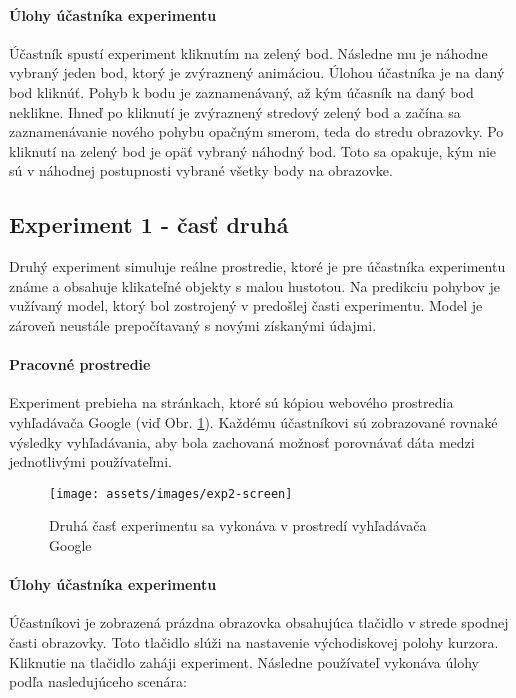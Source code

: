 \paragraph{Úlohy účastníka experimentu}
Účastník spustí experiment kliknutím na zelený bod. Následne mu je náhodne vybraný jeden bod, ktorý je zvýraznený animáciou. Úlohou účastníka je na daný bod kliknúť. Pohyb k bodu je zaznamenávaný, až kým účasník na daný bod neklikne. Ihneď po kliknutí je zvýraznený stredový zelený bod a začína sa zaznamenávanie nového pohybu opačným smerom, teda do stredu obrazovky. Po kliknutí na zelený bod je opäť vybraný náhodný bod. Toto sa opakuje, kým nie sú v náhodnej postupnosti vybrané všetky body na obrazovke. 

\subsection{Experiment 1 - časť druhá \label{sec:exp1-1}}
Druhý experiment simuluje reálne prostredie, ktoré je pre účastníka experimentu známe a obsahuje klikateľné objekty s malou hustotou. Na predikciu pohybov je vužívaný model, ktorý bol zostrojený v predošlej časti experimentu. Model je zároveň neustále prepočítavaný s novými získanými údajmi.

\paragraph{Pracovné prostredie}
Experiment prebieha na stránkach, ktoré sú kópiou webového prostredia vyhľadávača Google (viď Obr. \ref{fig:exp2-screen}). Každému účastníkovi sú zobrazované rovnaké výsledky vyhľadávania, aby bola zachovaná možnosť porovnávať dáta medzi jednotlivými používateľmi.

\begin{figure}[h]
\centering
\texttt{[image: assets/images/exp2-screen]}
\caption{Druhá časť experimentu sa vykonáva v prostredí vyhľadávača Google \label{fig:exp2-screen}}
\end{figure}

\paragraph{Úlohy účastníka experimentu}
Účastníkovi je zobrazená prázdna obrazovka obsahujúca tlačidlo v strede spodnej časti obrazovky. Toto tlačidlo slúži na nastavenie východiskovej polohy kurzora. Kliknutie na tlačidlo zaháji experiment. Následne používateľ vykonáva úlohy podľa nasledujúceho scenára:

